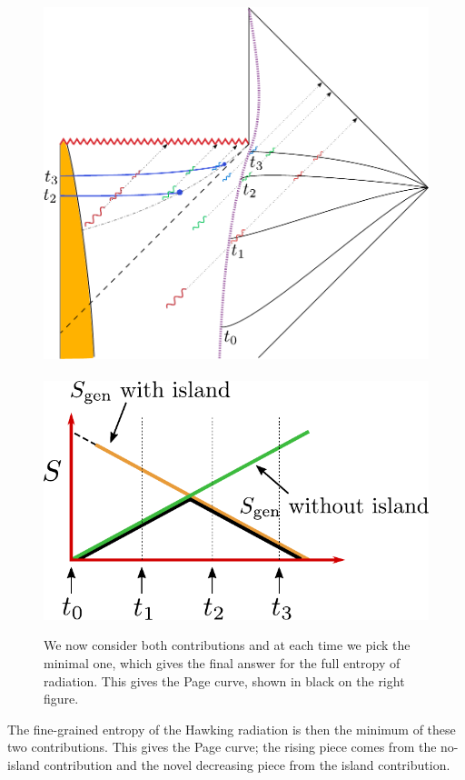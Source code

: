\begin{figure}[htbp]
\begin{center}
\includegraphics[scale=0.4]{figures/islandtransition.pdf}
 \ \ \ \ \ \ \includegraphics[scale=0.6]{figures/islandtransitioncurve.pdf}
\caption{ We now consider both contributions and at each time we pick the minimal one, which gives the final answer for the full entropy of radiation.   This gives the Page curve, shown in black on the right figure.    }
\label{radboth}
\end{center}
\end{figure}


The  fine-grained entropy of the Hawking radiation is then   the minimum of these two contributions. This gives the Page curve; the rising piece comes from  the no-island contribution and the novel decreasing piece from the island contribution. 

